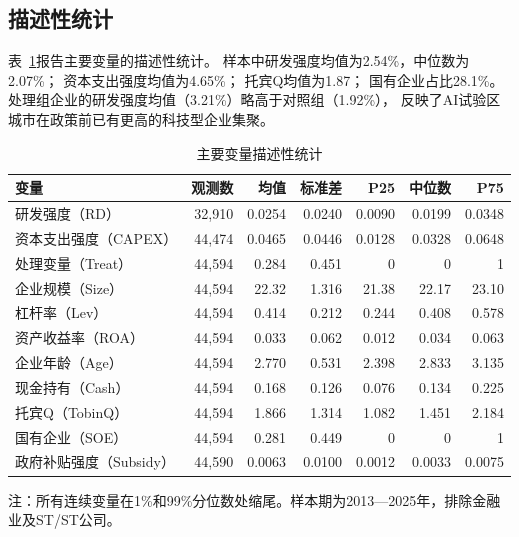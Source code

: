 \documentclass[12pt, a4paper]{article}
\begin{document}
\subsection{描述性统计}

表~\ref{tab:desc}报告主要变量的描述性统计。
样本中研发强度均值为2.54\%，中位数为2.07\%；
资本支出强度均值为4.65\%；
托宾Q均值为1.87；
国有企业占比28.1\%。
处理组企业的研发强度均值（3.21\%）略高于对照组（1.92\%），
反映了AI试验区城市在政策前已有更高的科技型企业集聚。

\begin{table}[htbp]
\centering
\caption{主要变量描述性统计}
\label{tab:desc}
\begin{threeparttable}
\begin{tabular}{lrrrrrr}
\toprule
变量 & 观测数 & 均值 & 标准差 & P25 & 中位数 & P75 \\
\midrule
研发强度（RD）         & 32,910 & 0.0254 & 0.0240 & 0.0090 & 0.0199 & 0.0348 \\
资本支出强度（CAPEX）  & 44,474 & 0.0465 & 0.0446 & 0.0128 & 0.0328 & 0.0648 \\
处理变量（Treat）      & 44,594 & 0.284  & 0.451  & 0      & 0      & 1      \\
企业规模（Size）       & 44,594 & 22.32  & 1.316  & 21.38  & 22.17  & 23.10  \\
杠杆率（Lev）          & 44,594 & 0.414  & 0.212  & 0.244  & 0.408  & 0.578  \\
资产收益率（ROA）      & 44,594 & 0.033  & 0.062  & 0.012  & 0.034  & 0.063  \\
企业年龄（Age）        & 44,594 & 2.770  & 0.531  & 2.398  & 2.833  & 3.135  \\
现金持有（Cash）       & 44,594 & 0.168  & 0.126  & 0.076  & 0.134  & 0.225  \\
托宾Q（TobinQ）        & 44,594 & 1.866  & 1.314  & 1.082  & 1.451  & 2.184  \\
国有企业（SOE）        & 44,594 & 0.281  & 0.449  & 0      & 0      & 1      \\
政府补贴强度（Subsidy）& 44,590 & 0.0063 & 0.0100 & 0.0012 & 0.0033 & 0.0075 \\
\bottomrule
\end{tabular}
\begin{tablenotes}
\small\kaiti
\item 注：所有连续变量在1\%和99\%分位数处缩尾。样本期为2013—2025年，排除金融业及ST/\*ST公司。
\end{tablenotes}
\end{threeparttable}
\end{table}
\end{document}
